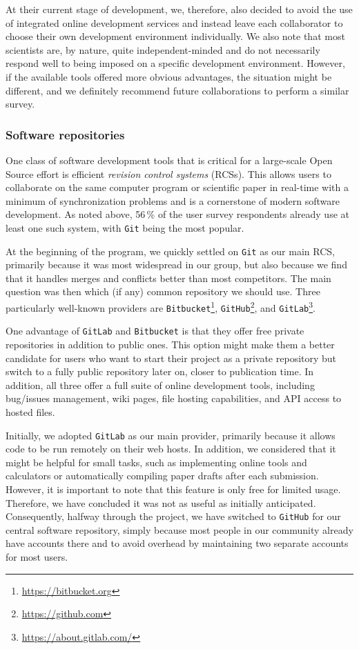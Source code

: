 \documentclass[twocolumn]{openjournal}
\begin{document}
At their current stage of development, we, therefore, also decided to avoid the
use of integrated online development services and instead leave each
collaborator to choose their own development environment individually. We also
note that most scientists are, by nature, quite independent-minded and do not
necessarily respond well to being imposed on a specific development
environment. However, if the available tools offered more obvious advantages,
the situation might be different, and we definitely recommend future
collaborations to perform a similar survey.


\subsubsection{Software repositories}

One class of software development tools that is critical for a large-scale Open
Source effort is efficient \textit{revision control systems} (RCSs). This
allows users to collaborate on the same computer program or scientific paper in
real-time with a minimum of synchronization problems and is a cornerstone of
modern software development. As noted above, 56\,\% of the user survey
respondents already use at least one such system, with \texttt{Git} being the
most popular.

At the beginning of the program, we quickly settled on \texttt{Git} as our main
RCS, primarily because it was most widespread in our group, but also because we
find that it handles merges and conflicts better than most competitors. The
main question was then which (if any) common repository we should use. Three
particularly well-known providers are
\texttt{Bitbucket}\footnote{\url{https://bitbucket.org}},
\texttt{GitHub}\footnote{\url{https://github.com}}, and
\texttt{GitLab}\footnote{\url{https://about.gitlab.com/}}.

One advantage of \texttt{GitLab} and \texttt{Bitbucket} is that they offer free
private repositories in addition to public ones. This option might make them a
better candidate for users who want to start their project as a private
repository but switch to a fully public repository later on, closer to
publication time. In addition, all three offer a full suite of online
development tools, including bug/issues management, wiki pages, file hosting
capabilities, and API access to hosted files.

Initially, we adopted \texttt{GitLab} as our main provider, primarily because
it allows code to be run remotely on their web hosts. In addition, we
considered that it might be helpful for small tasks, such as implementing
online tools and calculators or automatically compiling paper drafts after each
submission. However, it is important to note that this feature is only free for
limited usage. Therefore, we have concluded it was not as useful as initially
anticipated. Consequently, halfway through the project, we have switched to
\texttt{GitHub} for our central software repository, simply because most people
in our community already have accounts there and to avoid overhead by
maintaining two separate accounts for most users.
\end{document}
